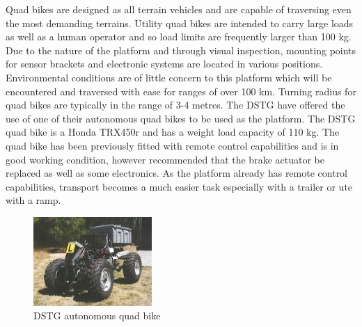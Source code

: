 \documentclass[main.tex]{subfiles}
\begin{document}
Quad bikes are designed as all terrain vehicles and are capable of traversing even the most demanding terrains. Utility quad bikes are intended to carry large loads as well as a human operator and so load limits are frequently larger than 100 kg. Due to the nature of the platform and through visual inspection, mounting points for sensor brackets and electronic systems are located in various positions.  Environmental conditions are of little concern to this platform which will be encountered and traversed with ease for ranges of over 100 km. Turning radius for quad bikes are typically in the range of 3-4 metres.
The DSTG have offered the use of one of their autonomous quad bikes to be used as the platform. The DSTG quad bike is a Honda TRX450r and has a weight load capacity of 110 kg. The quad bike has been previously fitted with remote control capabilities and is in good working condition, however \textcite{scheiner2011} recommended that the brake actuator be replaced as well as some electronics. As the platform already has remote control capabilities, transport becomes a much easier task especially with a trailer or ute with a ramp.
\begin{figure}[ht]
\includegraphics[width=0.4\textwidth]{3-ConceptDesign/2011quadbike.PNG}
\centering
\caption[DSTG autonomous quad bike]{DSTG autonomous quad bike \parencite{scheiner2011}} 
\end{figure}
\end{document}
